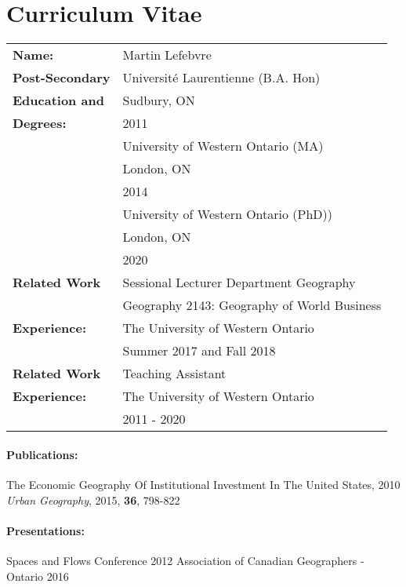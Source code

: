\documentclass[12pt,letterpaper]{book}
\numberwithin{figure}{chapter}
\newcommand{\firstname}{Martin}
\newcommand{\lastname}{Lefebvre}
\begin{document}
	\chapter*{Curriculum Vitae}
	\begin{table}[ht]
		\begin{tabular}{ll}
			\textbf{Name:} & \firstname{} \lastname\\
			
			
			\textbf{Post-Secondary} & Universit\'{e} Laurentienne (B.A. Hon)\\
			\textbf{Education and}& Sudbury, ON\\
			\textbf{Degrees:}& 2011\\
			& University of Western Ontario (MA)\\
			& London, ON\\
			& 2014 \\
			& University of Western Ontario (PhD))\\
			& London, ON\\
			& 2020 \\
			\textbf{Related Work}& Sessional Lecturer  Department Geography \\ 
			& Geography 2143: Geography of World Business\\
			\textbf{Experience:}& The University of Western Ontario\\
			& Summer 2017 and Fall 2018\\
			
			\textbf{Related Work}& Teaching Assistant\\
			\textbf{Experience:}& The University of Western Ontario\\
			& 2011 - 2020\\
		\end{tabular}
	\end{table}
	\subsubsection*{Publications:}
	The Economic Geography Of Institutional Investment In The United States, 2010 
	\textit{Urban Geography}, 2015, \textbf{36}, 798-822 
	
	\subsubsection*{Presentations:}
	Spaces and Flows Conference 2012 \newline
	Association of Canadian Geographers - Ontario 2016
\end{document}
